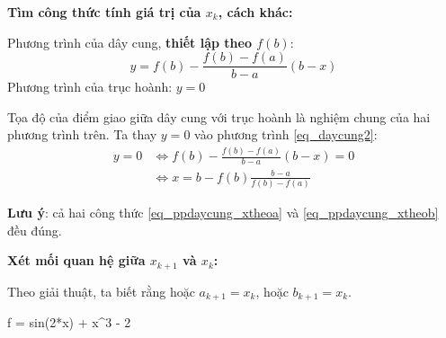 \documentclass[12pt]{article}
\begin{document}
\newpage{}

\textbf{Tìm công thức tính giá trị của $x_k$, cách khác:}

Phương trình của dây cung, \textbf{thiết lập theo $f(b)$}:
\begin{equation}\label{eq_daycung2}
y=f(b)-\frac{f(b)-f(a)}{b-a}(b-x) 
\end{equation}
Phương trình của trục hoành: $y=0$

Tọa độ của điểm giao giữa dây cung với trục hoành là nghiệm chung của hai phương trình trên. Ta thay $y=0$ vào phương trình \eqref{eq_daycung2}:
\begin{align}
y=0 &\Leftrightarrow f(b)-\frac{f(b)-f(a)}{b-a}(b-x)=0 \nonumber\\
&\Leftrightarrow x=b-f(b)\frac{b-a}{f(b)-f(a)} \label{eq_ppdaycung_xtheob}
\end{align}

\textbf{Lưu ý}: cả hai công thức \eqref{eq_ppdaycung_xtheoa} và \eqref{eq_ppdaycung_xtheob} đều đúng.

\newpage{}

\textbf{Xét mối quan hệ giữa $x_{k+1}$ và $x_k$:}

Theo giải thuật, ta biết rằng hoặc $a_{k+1}=x_k$, hoặc $b_{k+1}=x_k$.%



\newpage{}

\begin{sagesilent}
f = sin(2*x) + x^3 - 2
\end{sagesilent}
\end{document}

